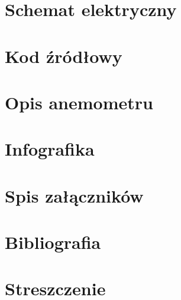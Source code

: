 \documentclass[12pt,a4paper,oneside]{memoir}
\begin{document}
\newpage
\chapter{Schemat elektryczny}

\newpage
\chapter{Kod źródłowy} 

\newpage
\chapter{Opis anemometru} 

\newpage
\chapter{Infografika} 

\newpage
\listoffigures
\newpage
\listoftables
\newpage
\chapter{Spis załączników} 

\newpage
\chapter{Bibliografia}
 
\newpage
\chapter{Streszczenie} 
\end{document}
